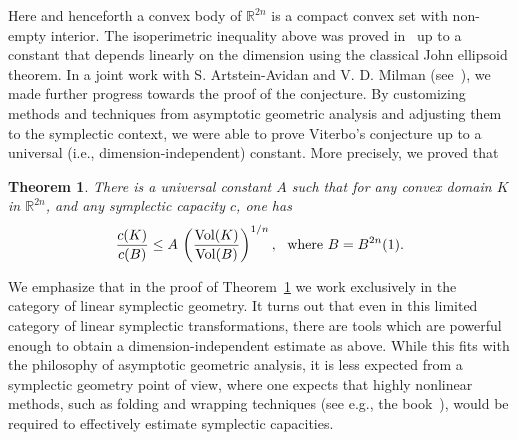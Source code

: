 \documentclass{icmart}
\newtheorem{theorem}{Theorem}[section]
\theoremstyle{definition}
\begin{document}
Here and henceforth a convex body of ${\mathbb R}^{2n}$ is a compact convex set with non-empty interior. 
The isoperimetric inequality above was proved in~\cite{V} up to a
constant that depends linearly on the dimension using the classical John ellipsoid theorem. In a joint work
with S. Artstein-Avidan and V. D. Milman (see~\cite{AMO}), we made further progress towards the proof
of the conjecture. By customizing %
methods and
techniques from asymptotic geometric analysis and adjusting them to
the symplectic context, we were able to prove Viterbo's conjecture up
to a universal  (i.e., dimension-independent) constant. More
precisely, we proved that %
\begin{theorem} \label{up-to-uni-constnat} There is a universal constant $A$ such that for
any convex domain $K$ in ${\mathbb R}^{2n}$, and any symplectic
capacity $c$, one has
$$ {\frac {c(K)} {c(B)}} \leq A \, \left (   {\frac {{\rm Vol}(K)} {{\rm Vol}(B)}} \right )^{1/n}, \ \ {\rm where} \ B = B^{2n}(1).$$
\end{theorem}

We emphasize that %
in the proof of Theorem~\ref{up-to-uni-constnat}  we work exclusively in the category of linear symplectic geometry.
It turns out that even in this limited category of linear symplectic transformations, there are tools which are powerful enough to obtain a dimension-independent estimate as above.
While this fits with the philosophy of asymptotic geometric analysis, it is less expected from a
symplectic geometry point of view, where  one expects that %
highly nonlinear methods, such as folding and wrapping techniques (see e.g., the book~\cite{Schle}), would be required to effectively estimate symplectic capacities.

\smallskip
\end{document}
